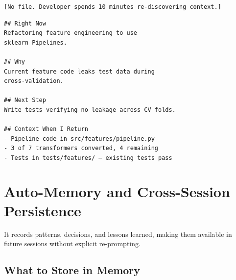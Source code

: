 
\begin{fullwidth}
\begin{beforeafter}
\before
\begin{verbatim}
[No file. Developer spends 10 minutes re-discovering context.]
\end{verbatim}

\after
\begin{verbatim}
## Right Now
Refactoring feature engineering to use
sklearn Pipelines.

## Why
Current feature code leaks test data during
cross-validation.

## Next Step
Write tests verifying no leakage across CV folds.

## Context When I Return
- Pipeline code in src/features/pipeline.py
- 3 of 7 transformers converted, 4 remaining
- Tests in tests/features/ — existing tests pass
\end{verbatim}
\end{beforeafter}
\end{fullwidth}


\section{Auto-Memory and Cross-Session Persistence}
\label{sec:memory}


It records patterns, decisions, and lessons learned, making them available
in future sessions without explicit re-prompting.

\subsection{What to Store in Memory}

